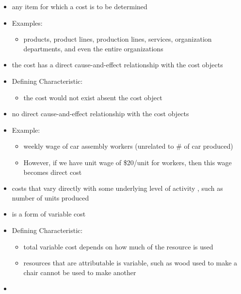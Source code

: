\documentclass[letterpaper, 12pt]{article}
\newcommand{\red}[1]{{\color{red}{#1}}}
\begin{document}
    \pagebreak

    \red{Cost Objects}
    \begin{itemize}
        \item any item for which a cost is to be determined
        \item Examples:
        \begin{itemize}
            \item products, product lines, production lines, services, organization departments, and even the entire organizations
        \end{itemize}
    \end{itemize}

    \red{Direct Cost}
    \begin{itemize}
        \item the cost has a direct cause-and-effect relationship with the cost objects
        \item Defining Characteristic:
        \begin{itemize}
            \item the cost would not exist absent the cost object
        \end{itemize}
    \end{itemize}

    \red{Indirect Cost}
    \begin{itemize}
        \item no direct cause-and-effect relationship with the cost objects
        \item Example:
        \begin{itemize}
            \item weekly wage of car assembly workers (unrelated to \# of car produced)
            \item However, if we have unit wage of \$20/unit for workers, then this wage becomes direct cost
        \end{itemize}
    \end{itemize}

    \red{Variable Costs}
    \begin{itemize}
        \item costs that vary directly with some underlying level of activity , such as number of units produced
        \item \red{Direct material cost} is a form of variable cost
        \item Defining Characteristic:
        \begin{itemize}
            \item total variable cost depends on how much of the resource is used
            \item resources that are attributable is variable, such as wood used to make a chair cannot be used to make another
        \end{itemize}
        \item 
    \end{itemize}
\end{document}
